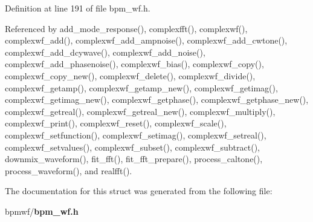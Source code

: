 Definition at line 191 of file bpm\_\-wf.h.

Referenced by add\_\-mode\_\-response(), complexfft(), complexwf(), complexwf\_\-add(), complexwf\_\-add\_\-ampnoise(), complexwf\_\-add\_\-cwtone(), complexwf\_\-add\_\-dcywave(), complexwf\_\-add\_\-noise(), complexwf\_\-add\_\-phasenoise(), complexwf\_\-bias(), complexwf\_\-copy(), complexwf\_\-copy\_\-new(), complexwf\_\-delete(), complexwf\_\-divide(), complexwf\_\-getamp(), complexwf\_\-getamp\_\-new(), complexwf\_\-getimag(), complexwf\_\-getimag\_\-new(), complexwf\_\-getphase(), complexwf\_\-getphase\_\-new(), complexwf\_\-getreal(), complexwf\_\-getreal\_\-new(), complexwf\_\-multiply(), complexwf\_\-print(), complexwf\_\-reset(), complexwf\_\-scale(), complexwf\_\-setfunction(), complexwf\_\-setimag(), complexwf\_\-setreal(), complexwf\_\-setvalues(), complexwf\_\-subset(), complexwf\_\-subtract(), downmix\_\-waveform(), fit\_\-fft(), fit\_\-fft\_\-prepare(), process\_\-caltone(), process\_\-waveform(), and realfft().

The documentation for this struct was generated from the following file:\begin{CompactItemize}
\item 
bpmwf/{\bf bpm\_\-wf.h}\end{CompactItemize}

